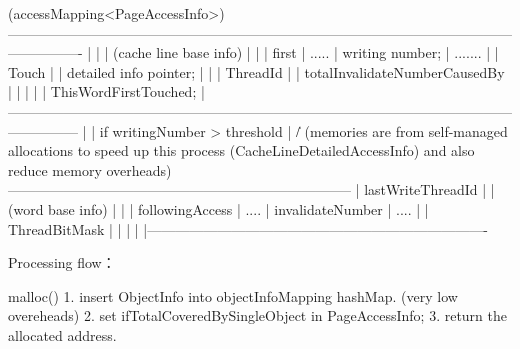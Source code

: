                                     (accessMapping<PageAccessInfo>)
        ----------------------------------------------------------------------------------------------------------------------------
        |           |           |      (cache line base info)       |                                                               |
        | first     |   .....   |   writing number;                 |             .......                                           |
        | Touch     |           |   detailed info pointer;          |                                                               |
        | ThreadId  |           |  totalInvalidateNumberCausedBy    |                                                               |
        |           |           |   ThisWordFirstTouched;           |
        ---------------------------------------------------------------------------------------------------------------------------
                                                  |
                                                  |  if writingNumber > threshold
                                                  |
                                                 \|/   (memories are from self-managed allocations to speed up this process
                    (CacheLineDetailedAccessInfo)       and also reduce memory overheads)
                 --------------------------------------------------------------------------
                 | lastWriteThreadId |             |    (word base info)     |            |
                 |  followingAccess  |    ....     |   invalidateNumber      |  ....      |
                 |   ThreadBitMask   |             |                         |            |
                 |-------------------------------------------------------------------------



Processing flow：

        malloc(){
            1. insert ObjectInfo into objectInfoMapping hashMap.   (very low overeheads)
            2. set ifTotalCoveredBySingleObject in PageAccessInfo;
            3. return the allocated address.
        }

